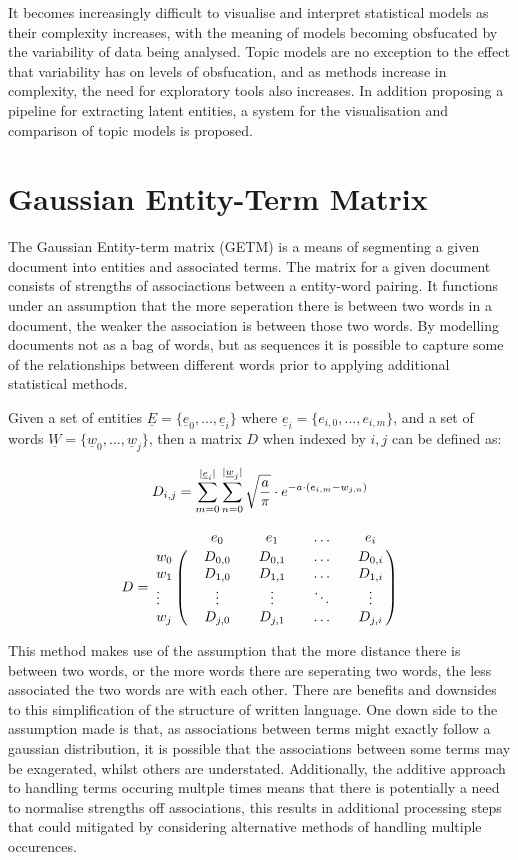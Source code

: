\documentclass[10pt]{report}
\begin{document}
It becomes increasingly difficult to visualise and interpret statistical models as their complexity increases, with the meaning of models becoming obsfucated by the variability of data being analysed. Topic models are no exception to the effect that variability has on levels of obsfucation, and as methods increase in complexity, the need for exploratory tools also increases. In addition proposing a pipeline for extracting latent entities, a system for the visualisation and comparison of topic models is proposed.

\section{Gaussian Entity-Term Matrix}

The Gaussian Entity-term matrix (GETM) is a means of segmenting a given document into entities and associated terms. The matrix for a given document consists of strengths of associactions between a entity-word pairing. It functions under an assumption that the more seperation there is between two words in a document, the weaker the association is between those two  words. By modelling documents not as a bag of words, but as sequences it is possible to capture some of the relationships between different words prior to applying additional statistical methods.

Given a set of entities \(\underline{E} = \{\underline{e}_0, ..., \underline{e}_i\}\) where \(\underline{e}_i = \{e_{i,0}, ..., e_{i,m}\}\), and a set of words \(\underline{W}=\{\underline{w}_0, ..., \underline{w}_j\}\), then a matrix \(D\) when indexed by \(i,j\) can be defined as:

\[
  D_{i,j}= \sum^{|\underline{e}_i|}_{m=0}\sum^{|\underline{w}_j|}_{n=0}\sqrt{a\over{\pi}}\cdot e^{-a\cdot(e_{i,m} - w_{j,n})}
\]

\[
  D =
  \bordermatrix{&&e_0 && e_1 &&\hdots && e_i\cr
    w_0 && D_{0,0} && D_{0,1} && \hdots && D_{0,i}\cr
    w_1 && D_{1,0} && D_{1,1} && \hdots && D_{1,i}\cr
    \vdots && \vdots && \vdots && \ddots && \vdots\cr
    w_j && D_{j,0} && D_{j,1} && \hdots && D_{j,i}
  }
\]

This method makes use of the assumption that the more distance there is between two words, or the more words there are seperating two words, the less associated the two words are with each other. There are benefits and downsides to this simplification of the structure of written language. One down side to the assumption made is that, as associations between terms might exactly follow a gaussian distribution, it is possible that the associations between some terms may be exagerated, whilst others are understated. Additionally, the additive approach to handling terms occuring multple times means that there is potentially a need to normalise strengths off associations, this results in additional processing steps that could mitigated by considering alternative methods of handling multiple occurences.
\end{document}
